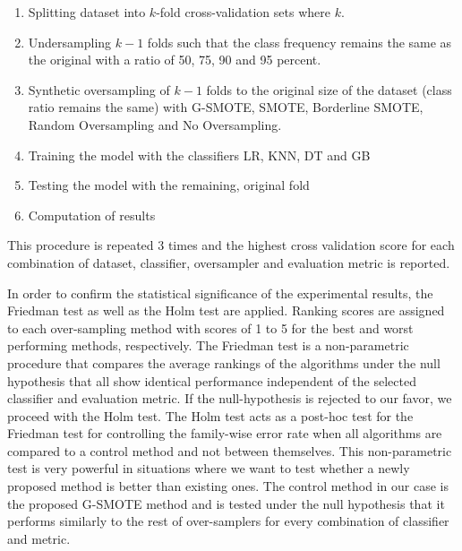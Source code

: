 \documentclass[parskip=full]{scrartcl}
\begin{document}
\begin{enumerate}
	
	\item 
	Splitting dataset into \( k \)-fold cross-validation sets where \( k \).

	\item 
	Undersampling \( k - 1 \) folds such that the class frequency remains 
	the same as the original with a ratio of 50, 75, 90 and 95 percent.

	\item 
	Synthetic oversampling of \( k - 1 \) folds to the original size of the
	dataset (class ratio remains the same) with G-SMOTE, SMOTE, Borderline
	SMOTE, Random Oversampling and No Oversampling.

	\item 
	Training the model with the classifiers LR, KNN, DT and GB

	\item 
	Testing the model with the remaining, original fold

	\item 
	Computation of results

\end{enumerate}	

This procedure is repeated 3 times and the highest cross validation score for
each combination of dataset, classifier, oversampler and evaluation metric is
reported.

In order to confirm the statistical significance of the experimental results,
the Friedman test \cite{Sheldon.1996} as well as the Holm test
\cite{JanezDemsar.2006} are applied. Ranking scores are assigned to each
over-sampling method with scores of 1 to 5 for the best and worst performing
methods, respectively. The Friedman test is a non-parametric procedure that
compares the average rankings of the algorithms under the null hypothesis that
all show identical performance independent of the selected classifier and
evaluation metric. If the null-hypothesis is rejected to our favor, we proceed
with the Holm test. The Holm test acts as a post-hoc test for the Friedman test
for controlling the family-wise error rate when all algorithms are compared to a
control method and not between themselves. This non-parametric test is very
powerful in situations where we want to test whether a newly proposed method is
better than existing ones. The control method in our case is the proposed
G-SMOTE method and is tested under the null hypothesis that it performs
similarly to the rest of over-samplers for every combination of classifier and
metric.
\end{document}
